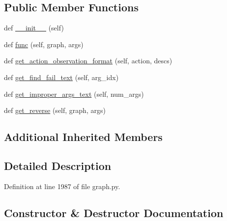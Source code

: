 \subsection*{Public Member Functions}
\begin{DoxyCompactItemize}
\item 
def \hyperlink{classlight__chats_1_1graph_1_1ExamineFunction_a7a65285c10c54ae332ee6252dca6cbe1}{\+\_\+\+\_\+init\+\_\+\+\_\+} (self)
\item 
def \hyperlink{classlight__chats_1_1graph_1_1ExamineFunction_a5a9150659aa698ebf73e302056c5ba46}{func} (self, graph, args)
\item 
def \hyperlink{classlight__chats_1_1graph_1_1ExamineFunction_ae3397289f3f0751980ba2a2165af82dc}{get\+\_\+action\+\_\+observation\+\_\+format} (self, action, descs)
\item 
def \hyperlink{classlight__chats_1_1graph_1_1ExamineFunction_a0f0eedfae1c6a0cdf83f94c6bc709128}{get\+\_\+find\+\_\+fail\+\_\+text} (self, arg\+\_\+idx)
\item 
def \hyperlink{classlight__chats_1_1graph_1_1ExamineFunction_a93ba8b835d12b96746a1548583e62887}{get\+\_\+improper\+\_\+args\+\_\+text} (self, num\+\_\+args)
\item 
def \hyperlink{classlight__chats_1_1graph_1_1ExamineFunction_ab489f99594157bdf84e8c67e7f9504bc}{get\+\_\+reverse} (self, graph, args)
\end{DoxyCompactItemize}
\subsection*{Additional Inherited Members}


\subsection{Detailed Description}
\begin{DoxyVerb}
\end{DoxyVerb}
 

Definition at line 1987 of file graph.\+py.



\subsection{Constructor \& Destructor Documentation}
\mbox{\label{classlight__chats_1_1graph_1_1ExamineFunction_a7a65285c10c54ae332ee6252dca6cbe1}} 
